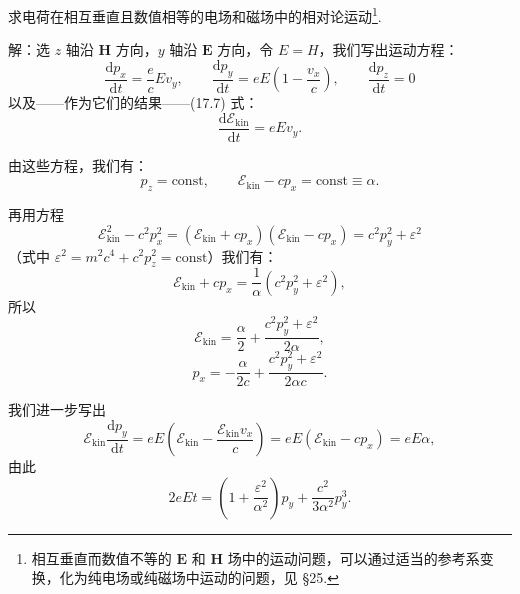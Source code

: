 \begin{xiti}
\quad 求电荷在相互垂直且数值相等的电场和磁场中的相对论运动\footnote{相互垂直而数值不等的 $\boldsymbol{E}$ 和 $\boldsymbol{H}$ 场中的运动问题，可以通过适当的参考系变换，化为纯电场或纯磁场中运动的问题，见 §25.}.

解：选 $z$ 轴沿 $\boldsymbol{H}$ 方向，$y$ 轴沿 $\boldsymbol{E}$ 方向，令 $E=H$，我们写出运动方程：
\begin{equation*}
  \frac{\mathrm{d}p_x}{\mathrm{d}t}=\frac{e}{c}Ev_y,\qquad
  \frac{\mathrm{d}p_y}{\mathrm{d}t}=eE\left(1-\frac{v_x}{c}\right),\qquad
  \frac{\mathrm{d}p_z}{\mathrm{d}t}=0
\end{equation*}
以及——作为它们的结果——(17.7) 式：
\begin{equation*}
  \frac{\mathrm{d}\mathcal{E}_\mathrm{kin}}{\mathrm{d}t}=eEv_y.
\end{equation*}

由这些方程，我们有：
\begin{equation*}
  p_z=\mathrm{const},\qquad
  \mathcal{E}_\mathrm{kin}-cp_x=\mathrm{const}\equiv\alpha.
\end{equation*}

再用方程
\begin{equation*}
  \mathcal{E}_\mathrm{kin}^2-c^2p_x^2
  =\left(\mathcal{E}_\mathrm{kin}+cp_x\right)
  \left(\mathcal{E}_\mathrm{kin}-cp_x\right)
  =c^2p_y^2+\varepsilon^2
\end{equation*}
（式中 $\varepsilon^2=m^2c^4+c^2p_z^2=\mathrm{const}$）我们有：
\begin{equation*}
  \mathcal{E}_\mathrm{kin}+cp_x=\frac{1}{\alpha}\left(c^2p_y^2+\varepsilon^2\right),
\end{equation*}
所以
\begin{equation*}
  \mathcal{E}_\mathrm{kin}=\frac{\alpha}{2}
  +\frac{c^2p_y^2+\varepsilon^2}{2\alpha},
\end{equation*}
\begin{equation*}
  p_x=-\frac{\alpha}{2c}+\frac{c^2p_y^2+\varepsilon^2}{2\alpha c}.
\end{equation*}

我们进一步写出
\begin{equation*}
  \mathcal{E}_\mathrm{kin}\frac{\mathrm{d}p_y}{\mathrm{d}t}
  =eE\left(\mathcal{E}_\mathrm{kin}-\frac{\mathcal{E}_\mathrm{kin}v_x}{c}\right)
  =eE\left(\mathcal{E}_\mathrm{kin}-cp_x\right)=eE\alpha,
\end{equation*}
由此
\begin{equation*}
  2eEt=\left(1+\frac{\varepsilon^2}{\alpha^2}\right)p_y
  +\frac{c^2}{3\alpha^2}p_y^3.\tag{1}
\end{equation*}


\end{xiti}
